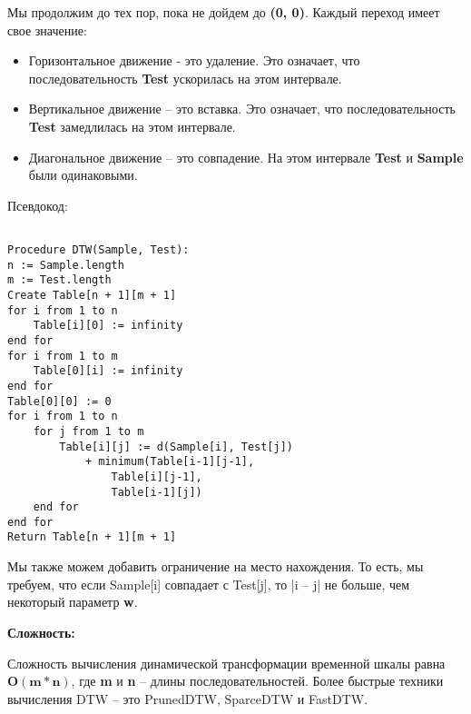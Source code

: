\vspace{\baselineskip}
\vspace{-0.2cm}
Мы продолжим до тех пор, пока не дойдем до \textbf{(0, 0)}. Каждый переход имеет свое значение:

\vspace{-0.1cm}
\begin{itemize}
  \item	Горизонтальное движение - это удаление. Это означает, что последовательность \textbf{Test} ускорилась на этом интервале.
  \vspace{-0.3cm}
  \item	Вертикальное движение – это вставка. Это означает, что последовательность \textbf{Test} замедлилась на этом интервале.
  \vspace{-0.3cm}
   \item Диагональное движение – это совпадение. На этом интервале \textbf{Test} и \textbf{Sample} были одинаковыми.
\end{itemize}

\vspace{\baselineskip}

\vspace{-1cm}
Псевдокод:

\begin{tcolorbox}
\begin{verbatim}

Procedure DTW(Sample, Test):
n := Sample.length
m := Test.length
Create Table[n + 1][m + 1]
for i from 1 to n
	Table[i][0] := infinity
end for
for i from 1 to m
	Table[0][i] := infinity
end for
Table[0][0] := 0
for i from 1 to n
	for j from 1 to m
		Table[i][j] := d(Sample[i], Test[j])
			+ minimum(Table[i-1][j-1],
				Table[i][j-1],
				Table[i-1][j])
	end for
end for
Return Table[n + 1][m + 1]

\end{verbatim}
\end{tcolorbox}

\vspace{\baselineskip}
\vspace{-0.3cm}
Мы также можем добавить ограничение на место нахождения. То есть, мы требуем, что если Sample[i] совпадает с Test[j], то |i – j| не больше, чем некоторый параметр \textbf{w}.

\vspace{\baselineskip}
\textbf{Сложность:}

Сложность вычисления динамической трансформации временной шкалы равна $\mathbf{O(m*n)}$, где \textbf{m} и \textbf{n} – длины последовательностей. Более быстрые техники вычисления DTW – это PrunedDTW, SparceDTW и FastDTW.

